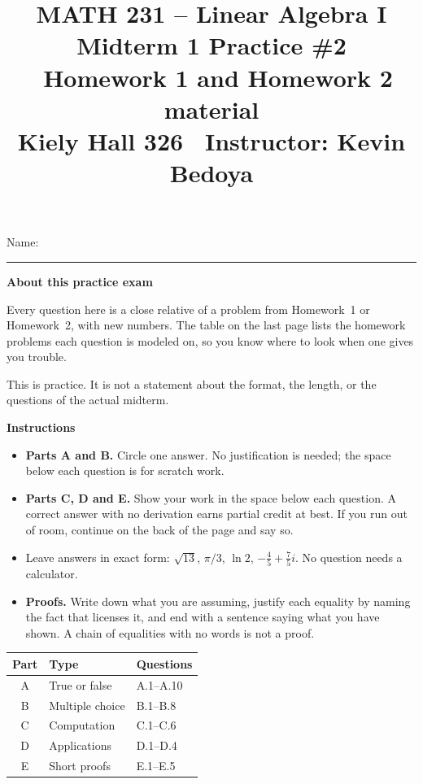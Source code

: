 \documentclass[11pt]{article}
\title{\vspace{-1.2cm}\textbf{\sffamily MATH 231 -- Linear Algebra I}\\[4pt]
       {\large\sffamily Midterm 1 Practice \#2 \textbullet\ Homework 1 and
        Homework 2 material}\\[2pt]
       {\normalsize\sffamily Kiely Hall 326 \textbullet\
        Instructor: Kevin Bedoya}}
\author{}
\date{}
\newcounter{prob}[section]
\newenvironment{callout}[1]
  {\par\medskip\needspace{5\baselineskip}%
   \begin{lrbox}{\qcbox}%
   \begin{minipage}{\dimexpr\textwidth-2\fboxsep-4pt}%
   \setlength{\parskip}{0.4em}%
   \textbf{\sffamily\color{RoyalBlue}#1}\par}
  {\end{minipage}\end{lrbox}%
   \begin{center}\colorbox{softbg}{\usebox{\qcbox}}\end{center}\medskip}
\begin{document}
\maketitle
\vspace{-1.4cm}

\begin{center}
\large\sffamily Name: \rule{9cm}{0.4pt}
\end{center}

\begin{callout}{About this practice exam}
Every question here is a close relative of a problem from Homework~1 or
Homework~2, with new numbers. The table on the last page lists the homework
problems each question is modeled on, so you know where to look when one gives
you trouble.

This is practice. It is not a statement about the format, the length, or the
questions of the actual midterm.
\end{callout}

\begin{callout}{Instructions}
\begin{itemize}[leftmargin=1.4em,itemsep=5pt,topsep=3pt]
  \item \textbf{Parts A and B.} Circle one answer. No justification is needed;
        the space below each question is for scratch work.
  \item \textbf{Parts C, D and E.} Show your work in the space below each
        question. A correct answer with no derivation earns partial credit at
        best. If you run out of room, continue on the back of the page and say
        so.
  \item Leave answers in exact form: $\sqrt{13}$, $\pi/3$, $\ln2$,
        $-\tfrac45+\tfrac75 i$. No question needs a calculator.
  \item \textbf{Proofs.} Write down what you are assuming, justify each
        equality by naming the fact that licenses it, and end with a sentence
        saying what you have shown. A chain of equalities with no words is not a
        proof.
\end{itemize}
\end{callout}

\begin{center}
\renewcommand{\arraystretch}{1.3}
\begin{tabular}{@{}c l l@{}}
\toprule
\textbf{Part} & \textbf{Type} & \textbf{Questions} \\
\midrule
A & True or false   & A.1--A.10 \\
B & Multiple choice & B.1--B.8 \\
C & Computation     & C.1--C.6 \\
D & Applications    & D.1--D.4 \\
E & Short proofs    & E.1--E.5 \\
\bottomrule
\end{tabular}
\end{center}
\end{document}

